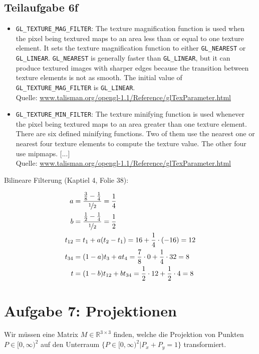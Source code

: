 \documentclass[a4paper]{scrartcl}
\begin{document}
\subsection*{Teilaufgabe 6f}
\begin{itemize}
    \item \texttt{GL\_TEXTURE\_MAG\_FILTER}: The texture magnification function
    is used when the pixel being textured maps to an area less than or equal to
    one texture element. It sets the texture magnification function to either
    \texttt{GL\_NEAREST} or \texttt{GL\_LINEAR}. \texttt{GL\_NEAREST} is
    generally faster than
    \texttt{GL\_LINEAR}, but it can produce textured images with sharper edges
    because the transition between texture elements is not as smooth. The
    initial value of \texttt{GL\_TEXTURE\_MAG\_FILTER} is \texttt{GL\_LINEAR}.\\
    Quelle: \href{https://www.talisman.org/opengl-1.1/Reference/glTexParameter.html}{www.talisman.org/opengl-1.1/Reference/glTexParameter.html}
    \item \texttt{GL\_TEXTURE\_MIN\_FILTER}: The texture minifying function is used whenever the pixel being textured maps to an area greater than one texture element. There are six defined minifying functions. Two of them use the nearest one or nearest four texture elements to compute the texture value. The other four use mipmaps. [...]\\
    Quelle: \href{https://www.talisman.org/opengl-1.1/Reference/glTexParameter.html}{www.talisman.org/opengl-1.1/Reference/glTexParameter.html}
\end{itemize}

Bilineare Filterung (Kaptiel 4, Folie 38):

\begin{align}
    a &= \frac{\frac{3}{8} - \frac{1}{4}}{\nicefrac{1}{2}} = \frac{1}{4}\\
    b &= \frac{\frac{1}{2} - \frac{1}{4}}{\nicefrac{1}{2}} = \frac{1}{2}\\
    t_{12} &= t_1 + a(t_2 - t_1) = 16 + \frac{1}{4} \cdot (-16) = 12\\
    t_{34} &= (1-a) t_3 + a t_4 = \frac{7}{8} \cdot 0 + \frac{1}{4} \cdot 32 = 8\\
    t &= (1-b) t_{12} + b t_{34} = \frac{1}{2} \cdot 12 + \frac{1}{2} \cdot 4 = 8
\end{align}

\clearpage
\section*{Aufgabe 7: Projektionen}
Wir müssen eine Matrix $M \in \mathbb{R}^{3 \times 3}$ finden, welche die
Projektion von Punkten $P \in [0, \infty)^2$ auf den Unterraum
$\{P \in [0, \infty)^2 | P_x + P_y = 1\}$ transformiert.
\end{document}
